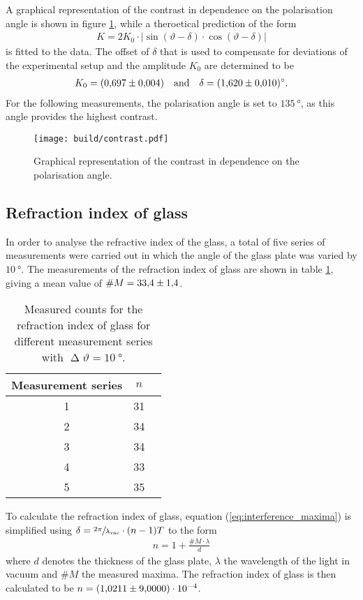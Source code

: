 \noindent
A graphical representation of the contrast in dependence on the polarisation angle is shown in figure \ref{fig:contrast}, while a theroetical prediction of the form
\begin{align}
    K = 2K_0\cdot|\sin(\vartheta-\delta)\cdot\cos(\vartheta-\delta)|
\end{align}
is fitted to the data.
The offset of $\delta$ that is used to compensate for deviations of the experimental setup and the amplitude $K_0$ are determined to be
\begin{align*}
    K_0=\SI{0.697\pm0.004}{} \quad \text{and} \quad \delta=\SI{1.620\pm0.010}{\degree}.
\end{align*}
For the following measurements, the polarisation angle is set to $\SI{135}{\degree}$, as this angle provides the highest contrast.
\begin{figure}[H]
    \centering
    \texttt{[image: build/contrast.pdf]}
    \caption{Graphical representation of the contrast in dependence on the polarisation angle.}
    \label{fig:contrast}
\end{figure}

\subsection{Refraction index of glass}
\label{subsec:refraction_glass}

In order to analyse the refractive index of the glass, a total of five series of measurements were carried out in which the angle of the glass plate was varied by $\SI{10}{\degree}$.
The measurements of the refraction index of glass are shown in table \ref{tab:refraction_glass}, giving a mean value of $\#M=\num{33.4\pm1.4}$.
\begin{table}[H]
    \centering
    \begin{tabular}{c c c}
        \toprule
        Measurement series & $n$ \\
        \midrule
        1 & 31 \\
        2 & 34 \\
        3 & 34 \\
        4 & 33 \\
        5 & 35 \\
        \bottomrule
    \end{tabular}
    \caption{Measured counts for the refraction index of glass for different measurement series with $\upDelta \vartheta=\SI{10}{\degree}$.}
    \label{tab:refraction_glass}
\end{table}
\noindent
To calculate the refraction index of glass, equation (\ref{eq:interference_maxima}) is simplified using $\delta=\sfrac{2\pi}{\lambda_{\text{vac}}}\cdot(n-1)T$ to the form
\begin{align}
    n = 1+ \frac{\#M\cdot\lambda}{d}
\end{align}
where $d$ denotes the thickness of the glass plate, $\lambda$ the wavelength of the light in vacuum and $\#M$ the measured maxima.
The refraction index of glass is then calculated to be $n=\num{1.0211\pm 9e-4}$. %

